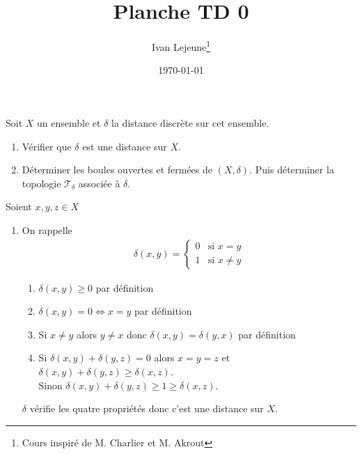 \documentclass[french,a4paper,10pt]{article}
\title{\color{astral} \sffamily \bfseries Planche TD 0}
\author{Ivan Lejeune\thanks{Cours inspiré de M. Charlier et M. Akrout}}
\date{\today}
\begin{document}
	
	\maketitle
	\begin{td-exo}
		Soit $X$ un ensemble et $\delta$ la distance discrète sur cet ensemble.
		\begin{enumerate}
			\item Vérifier que $\delta$ est une distance sur $X$.
			\item Déterminer les boules ouvertes et fermées de $(X, \delta)$. Puis déterminer la topologie $\mathcal{T}_\delta$ associée à $\delta$.
		\end{enumerate}
	\end{td-exo}
	\begin{td-sol}
		Soient $x,y,z\in X$
		\begin{enumerate}
			\item On rappelle
				\[\begin{aligned}
					\delta(x,y) = 
					\begin{cases}
						0&\text{si }x=y\\
						1&\text{si }x\ne y
					\end{cases}
				\end{aligned}\]
				\begin{enumerate}[label=$(\roman*)$]
					\item $\delta(x, y)\ge 0$ par définition
					
					\item $\delta(x,y) = 0 \Longleftrightarrow x=y$ par définition
					
					\item Si $x\ne y$ alors $y\ne x$ donc $\delta(x,y) = \delta(y,x)$ par définition
					
					\item Si $\delta(x,y) + \delta(y,z) = 0$ alors $x=y=z$ et  $\delta(x,y) + \delta(y,z) \ge \delta(x,z)$. \\Sinon $\delta(x,y) + \delta(y,z) \ge 1\ge \delta(x,z)$.
				\end{enumerate}
				$\delta$ vérifie les quatre propriétés donc c'est une distance sur $X$.
				

\end{enumerate}
\end{td-sol}
\end{document}
